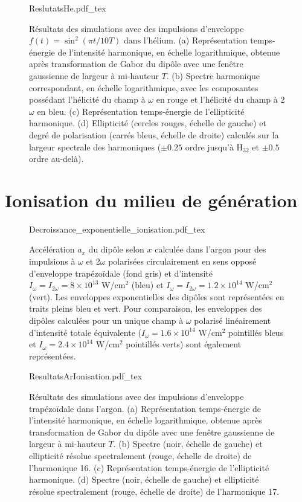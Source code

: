 \begin{figure}
\centering
\def\svgwidth{\textwidth}
{ReslutatsHe.pdf_tex}
\caption{Résultats des simulations avec des impulsions d'enveloppe $f(t) = \sin^2 (\pi t / 10 T)$ dans l'hélium. (a) Représentation temps-énergie de l'intensité harmonique, en échelle logarithmique, obtenue après transformation de Gabor du dipôle avec une fenêtre gaussienne de largeur à mi-hauteur $T$. (b) Spectre harmonique correspondant, en échelle logarithmique, avec les composantes possédant l'hélicité du champ à $\omega$ en rouge et l'hélicité du champ à 2$\omega$ en bleu. (c) Représentation temps-énergie de l'ellipticité harmonique. (d) Ellipticité (cercles rouges, échelle de gauche) et degré de polarisation (carrés bleus, échelle de droite) calculés sur la largeur spectrale des harmoniques ($\pm 0.25$ ordre jusqu'à H$_{32}$ et $\pm 0.5$ ordre au-delà).}
\label{fig:ResultatsHe}
\end{figure}

\section{Ionisation du milieu de génération}
\begin{figure}
\centering
\def\svgwidth{0.8\textwidth}
{Decroissance_exponentielle_ionisation.pdf_tex}
\caption{Accélération $a_x$ du dipôle selon $x$ calculée dans l'argon pour des impulsions à $\omega$ et 2$\omega$ polarisées circulairement en sens opposé d'enveloppe trapézoïdale (fond gris) et d'intensité $I_\omega = I_{2\omega} = 8 \times 10^{13}$ W/cm$^2$ (bleu) et $I_\omega = I_{2\omega} = 1.2 \times 10^{14}$ W/cm$^2$ (vert). Les enveloppes exponentielles des dipôles sont représentées en traits pleins bleu et vert. Pour comparaison, les enveloppes des dipôles calculées pour un unique champ à $\omega$ polarisé linéairement d'intensité totale équivalente ($I_\omega = 1.6 \times 10^{14}$ W/cm$^2$ pointillés bleus et $I_\omega = 2.4 \times 10^{14}$ W/cm$^2$ pointillés verts) sont également représentées.}
\label{fig:Decroissance_exponentielle_ionisation}
\end{figure}

\begin{figure}
\centering
\def\svgwidth{\textwidth}
{ResultatsArIonisation.pdf_tex}
\caption{Résultats des simulations avec des impulsions d'enveloppe trapézoïdale dans l'argon. (a) Représentation temps-énergie de l'intensité harmonique, en échelle logarithmique, obtenue après transformation de Gabor du dipôle avec une fenêtre gaussienne de largeur à mi-hauteur $T$. (b) Spectre (noir, échelle de gauche) et ellipticité résolue spectralement (rouge, échelle de droite) de l'harmonique 16. (c) Représentation temps-énergie de l'ellipticité harmonique. (d) Spectre (noir, échelle de gauche) et ellipticité résolue spectralement (rouge, échelle de droite) de l'harmonique 17.}
\label{fig:ResultatsArIonisation}
\end{figure}

